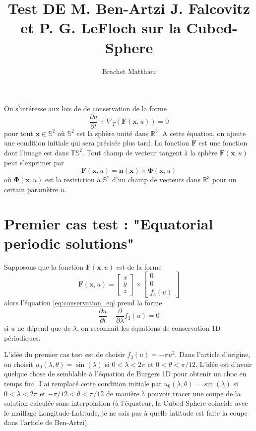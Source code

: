 \documentclass[10pt,a4paper]{article}
\author{Brachet Matthieu}
\title{Test  DE M. Ben-Artzi J. Falcovitz et P. G. LeFloch sur la Cubed-Sphere}
\begin{document}
\maketitle

On s'intéresse aux lois de de conservation de la forme 
\begin{equation}
\dfrac{\partial u}{\partial t} + \nabla_T (\mathbf{F}(\mathbf{x},u)) = 0
\label{eq:conservation_eq}
\end{equation}
pour tout $\mathbf{x} \in \mathbb{S}^2$ où $\mathbb{S}^2$ est la sphère unité dans $\mathbb{R}^3$. A cette équation, on ajoute une condition initiale qui sera précisée plus tard.
La fonction $\mathbf{F}$ est une fonction dont l'image est dans $\mathbb{T}\mathbb{S}^2$. Tout champ de vecteur tangent à la sphère $\mathbf{F}(\mathbf{x},u)$ peut s'exprimer par
\begin{equation}
\mathbf{F}(\mathbf{x},u) = \mathbf{n}(\mathbf{x}) \times \mathbf{\Phi}(\mathbf{x},u)
\end{equation}
où $\mathbf{\Phi}(\mathbf{x},u)$ est la restriction à $\mathbb{S}^2$ d'un champ de vecteurs dans $\mathbb{R}^3$ pour un certain paramètre $u$. 

\section{Premier cas test : "Equatorial periodic solutions"}
Supposons que la fonction $\mathbf{F}(\mathbf{x},u)$ est de la forme 
\begin{equation}
\mathbf{F}(\mathbf{x},u) = 
\begin{bmatrix}
x \\ y \\ z 
\end{bmatrix} \times
\begin{bmatrix}
0 \\ 0 \\ f_3(u) 
\end{bmatrix}
\end{equation}
alors l'équation \eqref{eq:conservation_eq} prend la forme
\begin{equation}
\dfrac{\partial u}{\partial t} - \dfrac{\partial}{\partial \lambda} f_3(u) = 0
\end{equation}
si $u$ ne dépend que de $\lambda$, on reconnaît les équations de conservation 1D périodiques.

L'idée du premier cas test est de choisir $f_3(u) = -\pi u^2$.
Dans l'article d'origine, on choisit $u_0(\lambda,\theta) = \sin ( \lambda )$ si $0 < \lambda < 2 \pi$ et $0 < \theta < \pi/12$. L'idée est d'avoir quelque chose de semblable à l'équation de Burgers 1D pour obtenir un choc en temps fini. 
J'ai remplacé cette condition initiale par $u_0(\lambda,\theta) = \sin ( \lambda )$ si $0 < \lambda < 2 \pi$ et $- \pi/12 < \theta < \pi/12$ de manière à pouvoir tracer une coupe de la solution calculée sans interpolation (à l'équateur, la Cubed-Sphere coincide avec le maillage Longitude-Latitude, je ne sais pas à quelle latitude est faite la coupe dans l'article de Ben-Artzi).
\end{document}

